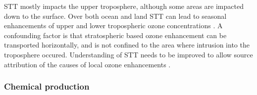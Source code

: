     STT mostly impacts the upper troposphere, although some areas are impacted 
    down to the surface.
    Over both ocean and land STT can lead to seasonal enhancements of upper and 
    lower tropospheric ozone concentrations 
    \parencite{Lin2015, Liu2017, Kuang2017}.
    A confounding factor is that stratospheric based ozone enhancement can be 
    transported horizontally, and is not confined to the area where intrusion 
    into the troposphere occured.
    Understanding of STT needs to be improved to allow source attribution of 
    the causes of local ozone enhancements \parencite{Lin2015}.
    
    
  \subsubsection{Chemical production}
    
